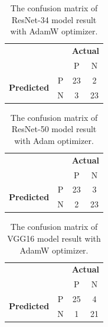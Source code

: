 \begin{table}[!h]
\centering
\caption{The confusion matrix of ResNet-34 model result with AdamW optimizer.}
\label{tab:conf_resnet34}
\begin{tabular}{|cc|c|c|}
\cline{1-4}
                                                 &   & \multicolumn{2}{c|}{\textbf{Actual}} \\ \cline{3-4} 
                                                 &   & P            & N            \\ \hline
\multicolumn{1}{|c|}{\multirow{2}{*}{\textbf{Predicted}}} & P & 23           & 2            \\ \cline{2-4} 
\multicolumn{1}{|c|}{}                           & N & 3            & 23           \\ \hline
\end{tabular}
\end{table}

\begin{table}[!h]
\centering
\caption{The confusion matrix of ResNet-50 model result with Adam optimizer.}
\label{tab:conf_resnet50}
\begin{tabular}{|cc|c|c|}
\cline{1-4}
                                                 &   & \multicolumn{2}{c|}{\textbf{Actual}} \\ \cline{3-4} 
                                                 &   & P            & N            \\ \hline
\multicolumn{1}{|c|}{\multirow{2}{*}{\textbf{Predicted}}} & P & 23           & 3            \\ \cline{2-4} 
\multicolumn{1}{|c|}{}                           & N & 2            & 23           \\ \hline
\end{tabular}
\end{table}

\begin{table}[!h]
\centering
\caption{The confusion matrix of VGG16 model result with AdamW optimizer.}
\label{tab:conf_vgg16}
\begin{tabular}{|cc|c|c|}
\cline{1-4}
                                                 &   & \multicolumn{2}{c|}{\textbf{Actual}} \\ \cline{3-4} 
                                                 &   & P            & N            \\ \hline
\multicolumn{1}{|c|}{\multirow{2}{*}{\textbf{Predicted}}} & P & 25           & 4            \\ \cline{2-4} 
\multicolumn{1}{|c|}{}                           & N & 1            & 21           \\ \hline
\end{tabular}
\end{table}

